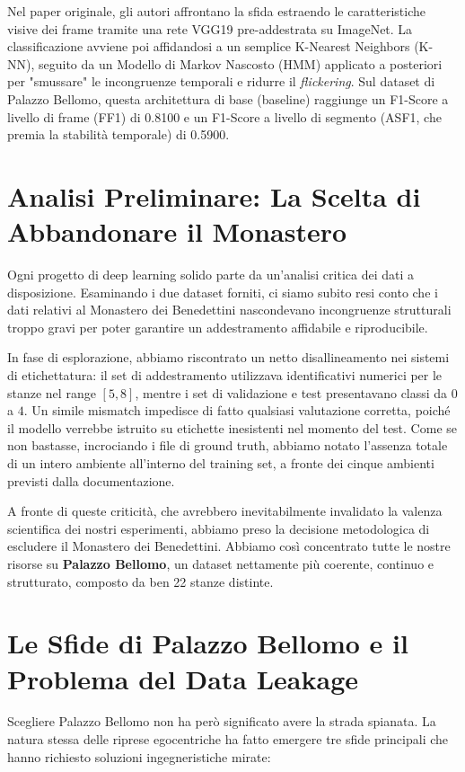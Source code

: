 \documentclass[a4paper,12pt]{report}
\begin{document}
Nel paper originale, gli autori affrontano la sfida estraendo le caratteristiche visive dei frame tramite una rete VGG19 pre-addestrata su ImageNet. La classificazione avviene poi affidandosi a un semplice K-Nearest Neighbors (K-NN), seguito da un Modello di Markov Nascosto (HMM) applicato a posteriori per "smussare" le incongruenze temporali e ridurre il \emph{flickering}. Sul dataset di Palazzo Bellomo, questa architettura di base (baseline) raggiunge un F1-Score a livello di frame (FF1) di 0.8100 e un F1-Score a livello di segmento (ASF1, che premia la stabilità temporale) di 0.5900.

\section{Analisi Preliminare: La Scelta di Abbandonare il Monastero}
Ogni progetto di deep learning solido parte da un'analisi critica dei dati a disposizione. Esaminando i due dataset forniti, ci siamo subito resi conto che i dati relativi al Monastero dei Benedettini nascondevano incongruenze strutturali troppo gravi per poter garantire un addestramento affidabile e riproducibile.

In fase di esplorazione, abbiamo riscontrato un netto disallineamento nei sistemi di etichettatura: il set di addestramento utilizzava identificativi numerici per le stanze nel range $[5, 8]$, mentre i set di validazione e test presentavano classi da $0$ a $4$. Un simile mismatch impedisce di fatto qualsiasi valutazione corretta, poiché il modello verrebbe istruito su etichette inesistenti nel momento del test. Come se non bastasse, incrociando i file di ground truth, abbiamo notato l'assenza totale di un intero ambiente all'interno del training set, a fronte dei cinque ambienti previsti dalla documentazione.

A fronte di queste criticità, che avrebbero inevitabilmente invalidato la valenza scientifica dei nostri esperimenti, abbiamo preso la decisione metodologica di escludere il Monastero dei Benedettini. Abbiamo così concentrato tutte le nostre risorse su \textbf{Palazzo Bellomo}, un dataset nettamente più coerente, continuo e strutturato, composto da ben 22 stanze distinte.

\section{Le Sfide di Palazzo Bellomo e il Problema del Data Leakage}
Scegliere Palazzo Bellomo non ha però significato avere la strada spianata. La natura stessa delle riprese egocentriche ha fatto emergere tre sfide principali che hanno richiesto soluzioni ingegneristiche mirate:
\end{document}
